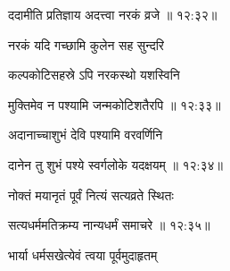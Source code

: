 
{\devanagarifont ददामीति प्रतिज्ञाय अदत्त्वा नरकं व्रजे {॥ १२:३२॥} \veg\dontdisplaylinenum }%

{\devanagarifont नरकं यदि गच्छामि कुलेन सह सुन्दरि \thinspace{\dandab} \dontdisplaylinenum }%

{\devanagarifont कल्पकोटिसहस्रे ऽपि नरकस्थो यशस्विनि  \danda\dontdisplaylinenum }%


{\devanagarifont मुक्तिमेव न पश्यामि जन्मकोटिशतैरपि {॥ १२:३३॥} \veg\dontdisplaylinenum }%

{\devanagarifont अदानाच्चाशुभं देवि पश्यामि वरवर्णिनि \thinspace{\dandab} \dontdisplaylinenum }%


{\devanagarifont दानेन तु शुभं पश्ये स्वर्गलोके यदक्षयम् {॥ १२:३४॥} \veg\dontdisplaylinenum }%

{\devanagarifont नोक्तं मयानृतं पूर्वं नित्यं सत्यव्रते स्थितः \thinspace{\dandab} \dontdisplaylinenum }%


{\devanagarifont सत्यधर्ममतिक्रम्य नान्यधर्मं समाचरे {॥ १२:३५॥} \veg\dontdisplaylinenum }%

{\devanagarifont भार्या धर्मसखेत्येवं त्वया पूर्वमुदाहृतम् \thinspace{\dandab} \dontdisplaylinenum }%


